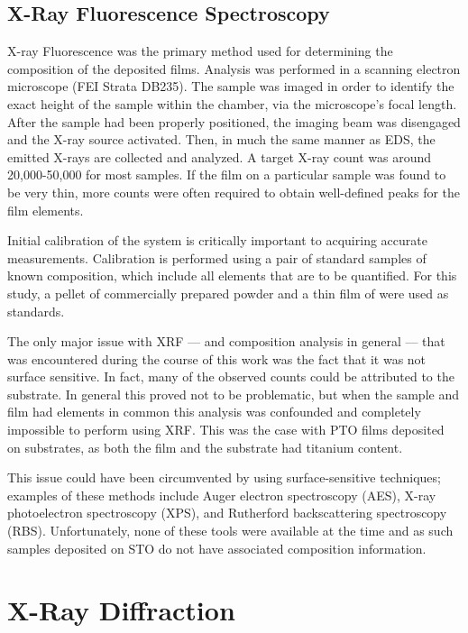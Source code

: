 \lipsum


\subsection{X-Ray Fluorescence Spectroscopy}
\label{sec:Methods-XRF}

X-ray Fluorescence was the primary method used for determining the composition of the deposited films. Analysis was performed in a scanning electron microscope (FEI Strata DB235). The sample was imaged in order to identify the exact height of the sample within the chamber, via the microscope's focal length. After the sample had been properly positioned, the imaging beam was disengaged and the X-ray source activated. Then, in much the same manner as EDS, the emitted X-rays are collected and analyzed. A target X-ray count was around 20,000-50,000 for most samples. If the film on a particular sample was found to be very thin, more counts were often required to obtain well-defined peaks for the film elements. 

Initial calibration of the system is critically important to acquiring accurate measurements. Calibration is performed using a pair of standard samples of known composition, which include all elements that are to be quantified. For this study, a pellet of commercially prepared \PTO{} powder and a thin film of  were used as standards. 

The only major issue with XRF --- and composition analysis in general --- that was encountered during the course of this work was the fact that it was not surface sensitive. In fact, many of the observed counts could be attributed to the substrate. In general this proved not to be problematic, but when the sample and film had elements in common this analysis was confounded and completely impossible to perform using XRF. This was the case with PTO films deposited on  substrates, as both the film and the substrate had titanium content. 

This issue could have been circumvented by using surface-sensitive techniques; examples of these methods include Auger electron spectroscopy (AES), X-ray photoelectron spectroscopy (XPS), and Rutherford backscattering spectroscopy (RBS). Unfortunately, none of these tools were available at the time and as such samples deposited on STO do not have associated composition information. 


\section{X-Ray Diffraction}
\label{sec:Methods-XRD}




%





